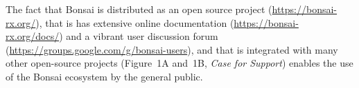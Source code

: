 \documentclass[a4paper,11pt]{article}
\begin{document}
The fact that Bonsai is distributed as an open source project
(\url{https://bonsai-rx.org/}), that is has extensive online documentation
(\url{https://bonsai-rx.org/docs/}) and a vibrant user discussion forum
(\url{https://groups.google.com/g/bonsai-users}), and that is integrated with
many other open-source projects (Figure~1A and~1B, \emph{Case for Support})
enables the use of the Bonsai ecosystem by the general public.
\end{document}
